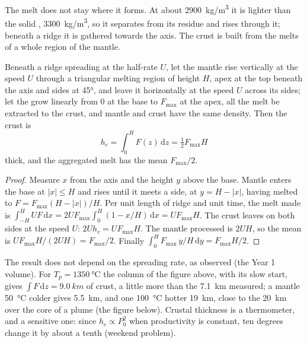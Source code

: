 The melt does not stay where it forms. At about \qty{2900}{kg/m^3} it is
lighter than the solid , \qty{3300}{kg/m^3}, so it separates from its
residue and rises through it; beneath a ridge it is gathered towards the axis.
The crust is built from the melts of a whole region of the mantle.

\begin{proposition}\label{prop:b2:mantle-melting:triangle}
Beneath a ridge spreading at the half-rate $U$, let the mantle rise vertically at
the speed $U$ through a triangular melting region of height $H$, apex at the top
beneath the axis and sides at \ang{45}, and leave it horizontally at the speed $U$
across its sides; let the  grow linearly from $0$ at the base to
$F_{\max}$ at the apex, all the melt be extracted to the crust, and mantle and
crust have the same density. Then the crust is
\[
  h_c = \int_0^H F(z)\,\mathrm dz = \tfrac12 F_{\max}H
\]
thick, and the aggregated melt has the mean  $F_{\max}/2$.
\end{proposition}

\begin{proof}
Measure $x$ from the axis and the height $y$ above the base. Mantle enters the base
at $|x| \le H$ and rises until it meets a side, at $y = H - |x|$, having melted to
$F = F_{\max}(H - |x|)/H$. Per unit length of ridge and unit time, the melt made is
$\int_{-H}^{H} U F\,\mathrm dx = 2UF_{\max}\int_0^H (1 - x/H)\,\mathrm dx =
UF_{\max}H$. The crust leaves on both sides at the speed $U$: $2Uh_c = UF_{\max}H$.
The mantle processed is $2UH$, so the mean  is $UF_{\max}H/(2UH) =
F_{\max}/2$. Finally $\int_0^H F_{\max}\,y/H\,\mathrm dy = F_{\max}H/2$.
\end{proof}

The result does not depend on the spreading rate, as observed (the Year 1
volume). For $T_p = \qty{1350}{\celsius}$ the column of the figure above, with its
slow start, gives $\int F\,\mathrm dz = \qty{9.0}{km}$ of crust, a little more
than the \qty{7.1}{km} measured; a mantle \qty{50}{\celsius} colder gives
\qty{5.5}{km}, and one \qty{100}{\celsius} hotter \qty{19}{km}, close to the
\qty{20}{km} over the core of a plume (the figure below). Crustal thickness is a
thermometer, and a sensitive one: since $h_c \propto P_0^2$ when productivity is
constant, ten degrees change it by about a tenth (weekend problem).

